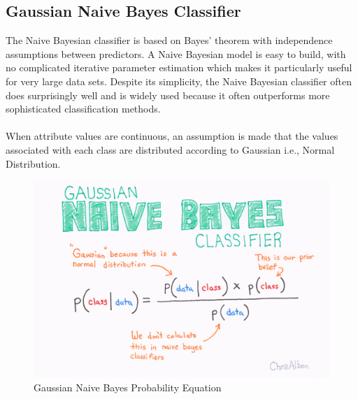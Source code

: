 \documentclass[10pt,a4paper]{article}
\begin{document}
\subsection{Gaussian Naive Bayes Classifier}
The Naive Bayesian classifier is based on Bayes’ theorem with independence assumptions between predictors. A Naive Bayesian model is easy to build, with no complicated iterative parameter estimation which makes it particularly useful for very large data sets. Despite its simplicity, the Naive Bayesian classifier often does surprisingly well and is widely used because it often outperforms more sophisticated classification methods.\\\\
When attribute values are continuous, an assumption is made that the values associated with each class are distributed according to Gaussian i.e., Normal Distribution.
\begin{figure}[htp]
\centering
\includegraphics[scale=0.90]{Gaussian_Naive_Bayes_Classifier_print.png}
\caption{Gaussian Naive Bayes Probability Equation~\cite{b}}
\end{figure}\\
\end{document}
